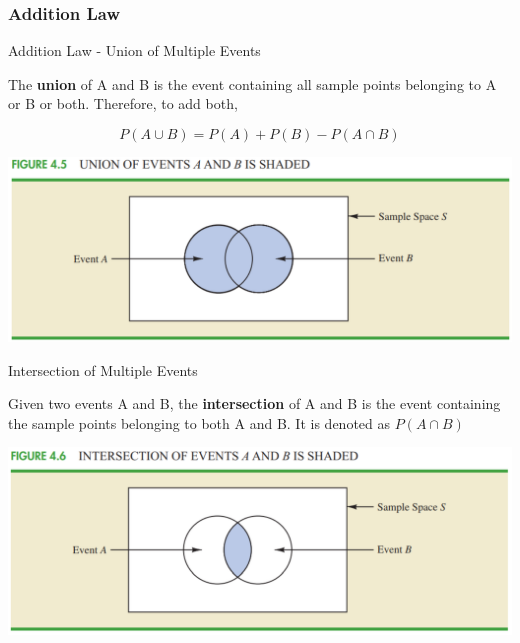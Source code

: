 \documentclass{beamer}
\begin{document}
\subsubsection{Addition Law}
\begin{frame}{Addition Law - Union of Multiple Events}

The \textbf{union} of A and B is the event containing all sample points belonging to A or B or both. Therefore, to add both, 

$$ P(A \cup B) = P(A) + P(B) - P(A \cap B)$$ 

\includegraphics[scale=0.4]{images/ch3UnionEvents.png}


\end{frame}


\begin{frame}{Intersection of Multiple Events}

Given two events A and B, the \textbf{intersection} of A and B is the event containing the sample points belonging to both A and B.
\vspace{0.3 cm}
\linebreak It is denoted as $P(A \cap B)$ 

\vspace{0.6 cm}
\includegraphics[scale=0.4]{images/ch3IntersectionEvents.png}

\end{frame}
\end{document}
